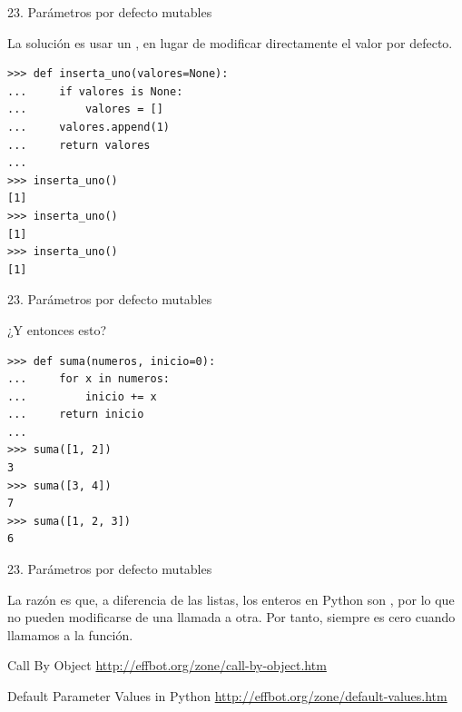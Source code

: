 \documentclass[14pt]{beamer}
\begin{document}
\begin{frame}[fragile]{23. Parámetros por defecto mutables}
  \begin{block}{}
    \centering
    La solución es usar un , en
    lugar de modificar directamente el valor por defecto.
  \end{block}

  \begin{exampleblock}{}
    \footnotesize
    \begin{lstlisting}
>>> def inserta_uno(valores=None):
...     if valores is None:
...         valores = []
...     valores.append(1)
...     return valores
...
>>> inserta_uno()
[1]
>>> inserta_uno()
[1]
>>> inserta_uno()
[1]
    \end{lstlisting}
  \end{exampleblock}
\end{frame}

\begin{frame}[fragile]{23. Parámetros por defecto mutables}
  \begin{alertblock}
    \large
    \centering
    ¿Y entonces esto?
  \end{alertblock}

  \begin{exampleblock}{}
    \small
    \begin{lstlisting}
>>> def suma(numeros, inicio=0):
...     for x in numeros:
...         inicio += x
...     return inicio
...
>>> suma([1, 2])
3
>>> suma([3, 4])
7
>>> suma([1, 2, 3])
6
    \end{lstlisting}
  \end{exampleblock}
\end{frame}

\begin{frame}[fragile]{23. Parámetros por defecto mutables}
  \begin{block}{}
    \centering
    La razón es que, a diferencia de las listas, los enteros en Python
    son , por lo que no pueden modificarse de
    una llamada a otra. Por tanto,  siempre es cero
    cuando llamamos a la función.
  \end{block}

  \small
  \begin{block}
    {\centering Call By Object}
    \centering \url{http://effbot.org/zone/call-by-object.htm}
  \end{block}

  \begin{block}
    {\centering Default Parameter Values in Python}
    \centering \url{http://effbot.org/zone/default-values.htm}
  \end{block}
\end{frame}
\end{document}

